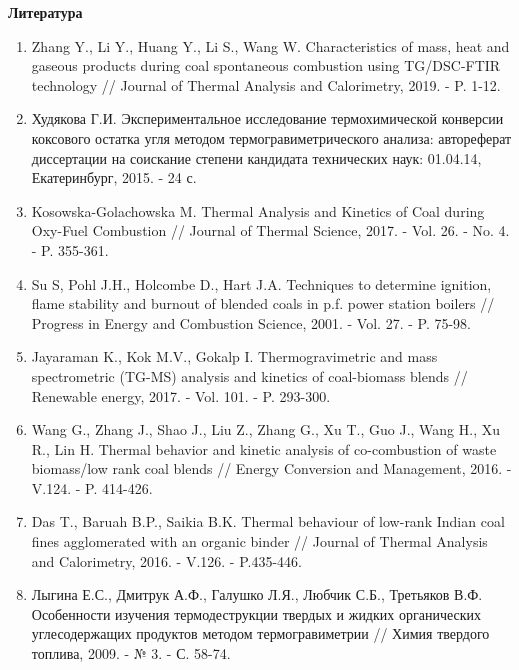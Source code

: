 \begin{center}
{\bfseries Литература}
\end{center}

\begin{enumerate}
\item
Zhang Y., Li Y., Huang Y., Li S., Wang W. Characteristics of mass,
heat and gaseous products during coal spontaneous combustion using
TG/DSC-FTIR technology // Journal of Thermal Analysis and Calorimetry,
2019. - P. 1-12.

\item
Худякова Г.И. Экспериментальное исследование термохимической
конверсии коксового остатка угля методом термогравиметрического анализа:
автореферат диссертации на соискание степени кандидата технических наук:
01.04.14, Екатеринбург, 2015. - 24 с.

\item
Kosowska-Golachowska M. Thermal Analysis and Kinetics of Coal during
Oxy-Fuel Combustion // Journal of Thermal Science, 2017. - Vol. 26. -
No. 4. - P. 355-361.

\item
Su S, Pohl J.H., Holcombe D., Hart J.A. Techniques to determine
ignition, flame stability and burnout of blended coals in p.f. power
station boilers // Progress in Energy and Combustion Science, 2001. -
Vol. 27. - P. 75-98.

\item
Jayaraman K., Kok M.V., Gokalp I. Thermogravimetric and mass
spectrometric (TG-MS) analysis and kinetics of coal-biomass blends //
Renewable energy, 2017. - Vol. 101. - P. 293-300.

\item
Wang G., Zhang J., Shao J., Liu Z., Zhang G., Xu T., Guo J., Wang H.,
Xu R., Lin H. Thermal behavior and kinetic analysis of co-combustion of
waste biomass/low rank coal blends // Energy Conversion and Management,
2016. - V.124. - P. 414-426.

\item
Das T., Baruah B.P., Saikia B.K. Thermal behaviour of low-rank Indian
coal fines agglomerated with an organic binder // Journal of Thermal
Analysis and Calorimetry, 2016. - V.126. - P.435-446.

\item
Лыгина Е.С., Дмитрук А.Ф., Галушко Л.Я., Любчик С.Б., Третьяков В.Ф.
Особенности изучения термодеструкции твердых и жидких органических
углесодержащих продуктов методом термогравиметрии // Химия твердого
топлива, 2009. - № 3. - С. 58-74.


\end{enumerate}
